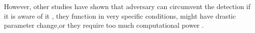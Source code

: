 However, other studies have shown that adversary can circumvent the detection if it is aware of it \cite{yin2022adc} , they function in very specific conditions,\cite{yin2022adc}  might have drastic parameter change\cite{zheng2020efficient},or they require too much computational power \cite{yuan2019adversarial,uesato2018adversarial,yin2022adc}. 





